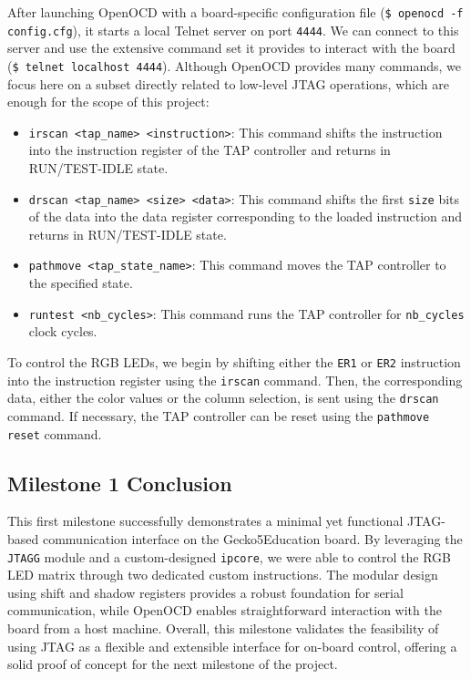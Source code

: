 \documentclass[a4paper,11pt,oneside]{report}
\newcommand{\boardName}{Gecko5Education \xspace}
\begin{document}
After launching OpenOCD with a board-specific configuration file (\texttt{\$ openocd -f config.cfg}), it starts a local Telnet server on port \texttt{4444}.  
We can connect to this server and use the extensive command set it provides to interact with the board (\texttt{\$ telnet localhost 4444}).  
Although OpenOCD provides many commands, we focus here on a subset directly related to low-level JTAG operations, which are enough for the scope of this project:

\begin{itemize}
    \item \verb|irscan <tap_name> <instruction>|: This command shifts the instruction into the instruction register of the TAP controller and returns in RUN/TEST-IDLE state.
    \item \verb|drscan <tap_name> <size> <data>|: This command shifts the first \texttt{size} bits of the data into the data register corresponding to the loaded instruction and returns in RUN/TEST-IDLE state.
    \item \verb|pathmove <tap_state_name>|: This command moves the TAP controller to the specified state.
    \item \verb|runtest <nb_cycles>|: This command runs the TAP controller for \texttt{nb\_cycles} clock cycles.
\end{itemize}

To control the RGB LEDs, we begin by shifting either the \texttt{ER1} or \texttt{ER2} instruction into the instruction register using the \texttt{irscan} command.  
Then, the corresponding data, either the color values or the column selection, is sent using the \texttt{drscan} command.  
If necessary, the TAP controller can be reset using the \texttt{pathmove reset} command.

\subsection{Milestone 1 Conclusion}

This first milestone successfully demonstrates a minimal yet functional JTAG-based communication interface on the \boardName board.  
By leveraging the \texttt{JTAGG} module and a custom-designed \texttt{ipcore}, we were able to control the RGB LED matrix through two dedicated custom instructions.  
The modular design using shift and shadow registers provides a robust foundation for serial communication, while OpenOCD enables straightforward interaction with the board from a host machine.  
Overall, this milestone validates the feasibility of using JTAG as a flexible and extensible interface for on-board control, offering a solid proof of concept for the next milestone of the project.
\end{document}
